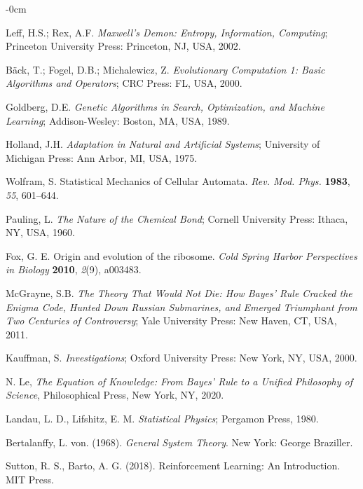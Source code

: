 \documentclass[entropy,article,submit,pdftex,moreauthors]{Definitions/mdpi}
\begin{document}
\begin{adjustwidth}{-\extralength}{0cm}
\begin{thebibliography}{999}
Leff, H.S.; Rex, A.F. \textit{Maxwell’s Demon: Entropy, Information, Computing}; Princeton University Press: Princeton, NJ, USA, 2002.

Bäck, T.; Fogel, D.B.; Michalewicz, Z. \textit{Evolutionary Computation 1: Basic Algorithms and Operators}; CRC Press: FL, USA, 2000.

Goldberg, D.E. \textit{Genetic Algorithms in Search, Optimization, and Machine Learning}; Addison-Wesley: Boston, MA, USA, 1989.

Holland, J.H. \textit{Adaptation in Natural and Artificial Systems}; University of Michigan Press: Ann Arbor, MI, USA, 1975.

Wolfram, S. Statistical Mechanics of Cellular Automata. \textit{Rev. Mod. Phys.} \textbf{1983}, \textit{55}, 601–644.

Pauling, L. \textit{The Nature of the Chemical Bond}; Cornell University Press: Ithaca, NY, USA, 1960.

Fox, G. E. 
Origin and evolution of the ribosome. 
\textit{Cold Spring Harbor Perspectives in Biology} \textbf{2010}, \textit{2}(9), a003483.

McGrayne, S.B. \textit{The Theory That Would Not Die: How Bayes' Rule Cracked the Enigma Code, Hunted Down Russian Submarines, and Emerged Triumphant from Two Centuries of Controversy}; Yale University Press: New Haven, CT, USA, 2011.

Kauffman, S. \textit{Investigations}; Oxford University Press: New York, NY, USA, 2000.

 N. Le, \textit{The Equation of Knowledge: From Bayes’ Rule to a Unified Philosophy of Science}, Philosophical Press, New York, NY, 2020.

Landau, L. D., Lifshitz, E. M. \textit{Statistical Physics}; Pergamon Press, 1980.

Bertalanffy, L. von. (1968). \textit{General System Theory}. New York: George Braziller.

Sutton, R. S., Barto, A. G. (2018). Reinforcement Learning: An Introduction. MIT Press.


\end{thebibliography}
\end{adjustwidth}
\end{document}
